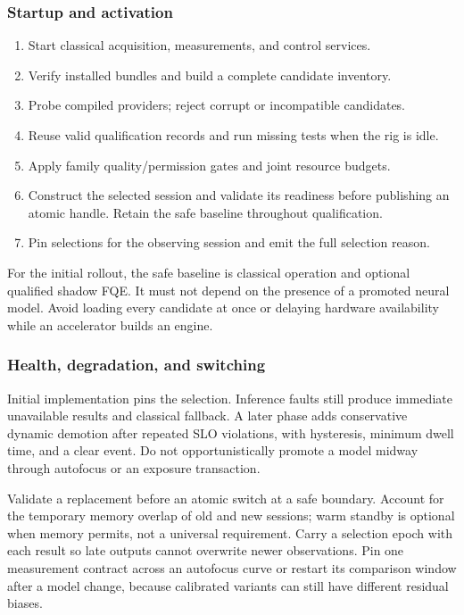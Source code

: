 \documentclass[11pt,a4paper]{article}
\begin{document}
\subsubsection{Startup and activation}
\begin{enumerate}
\item Start classical acquisition, measurements, and control services.
\item Verify installed bundles and build a complete candidate inventory.
\item Probe compiled providers; reject corrupt or incompatible candidates.
\item Reuse valid qualification records and run missing tests when the rig is idle.
\item Apply family quality/permission gates and joint resource budgets.
\item Construct the selected session and validate its readiness before publishing
an atomic handle. Retain the safe baseline throughout qualification.
\item Pin selections for the observing session and emit the full selection reason.
\end{enumerate}
For the initial rollout, the safe baseline is classical operation and optional
qualified shadow FQE. It must not depend on the presence of a promoted neural
model. Avoid loading every candidate at once or delaying hardware availability
while an accelerator builds an engine.

\subsubsection{Health, degradation, and switching}
Initial implementation pins the selection. Inference faults still produce
immediate unavailable results and classical fallback. A later phase adds
conservative dynamic demotion after repeated SLO violations, with hysteresis,
minimum dwell time, and a clear event. Do not opportunistically promote a model
midway through autofocus or an exposure transaction.

Validate a replacement before an atomic switch at a safe boundary. Account for
the temporary memory overlap of old and new sessions; warm standby is optional
when memory permits, not a universal requirement. Carry a selection epoch with
each result so late outputs cannot overwrite newer observations. Pin one
measurement contract across an autofocus curve or restart its comparison
window after a model change, because calibrated variants can still have
different residual biases.
\end{document}
